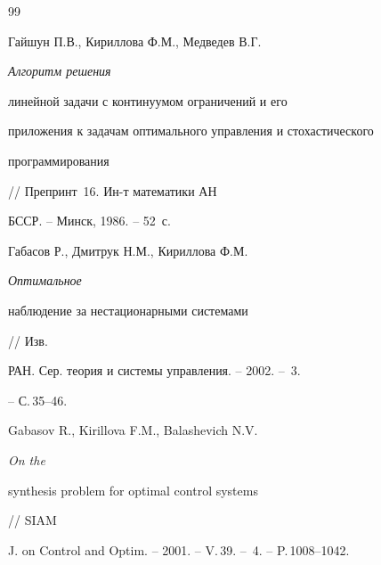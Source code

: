 \begin{thebibliography}{99}


Гайшун П.В., Кириллова Ф.М., Медведев В.Г. {\em Алгоритм решения


линейной задачи с континуумом ограничений и его


приложения к задачам оптимального управления и стохастического


программирования} // Препринт \No\,16. Ин-т математики АН


БССР. -- Минск, 1986. -- 52~с. 







Габасов Р., Дмитрук Н.М., Кириллова Ф.М. {\em Оптимальное


наблюдение за нестационарными системами} // Изв.


РАН. Сер. теория и системы управления. -- 2002. -- \No\,3.


-- С.\,35--46.







Gabasov R., Kirillova F.M., Balashevich N.V. {\em On the


synthesis problem for optimal control systems} // SIAM


J. on Control and Optim. -- 2001. -- V.\,39. -- \No\,4. -- P.\,1008--1042.





\end{thebibliography}





\vskip 2cm














\label{end}





